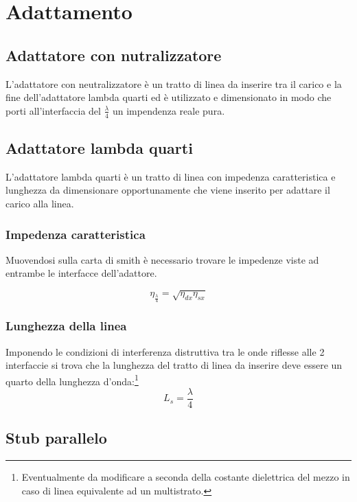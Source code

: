 \chapter{Adattamento}

	\section{Adattatore con nutralizzatore}

		L'adattatore con neutralizzatore è un tratto di linea da inserire tra il carico e la fine dell'adattatore lambda quarti ed è utilizzato e dimensionato in modo che porti all'interfaccia del $\frac{\lambda}{4}$ un impendenza reale pura.

	\section{Adattatore lambda quarti}
		
		L'adattatore lambda quarti è un tratto di linea con impedenza caratteristica e lunghezza da dimensionare opportunamente che viene inserito per adattare il carico alla linea.

		\subsection{Impedenza caratteristica}
				Muovendosi sulla carta di smith è necessario trovare le impedenze viste ad entrambe le interfacce dell'adattore.

				\begin{equation}
				\eta_{\frac{\lambda}{4}}=\sqrt{\eta_{dx}\eta_{sx}}
				\end{equation}

		\subsection{Lunghezza della linea}
				Imponendo le condizioni di interferenza distruttiva tra le onde riflesse alle 2 interfaccie si trova che la lunghezza del tratto di linea da inserire deve essere un quarto della lunghezza d'onda:\footnote{Eventualmente da modificare a seconda della costante dielettrica del mezzo in caso di linea equivalente ad un multistrato.}
				\begin{equation}
				L_s= \frac {\lambda} {4}
				\end{equation}

	\section{Stub parallelo}

